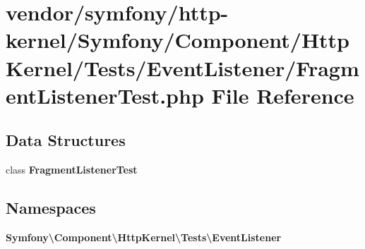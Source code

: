 \section{vendor/symfony/http-\/kernel/\+Symfony/\+Component/\+Http\+Kernel/\+Tests/\+Event\+Listener/\+Fragment\+Listener\+Test.php File Reference}
\label{_fragment_listener_test_8php}
\subsection*{Data Structures}
\begin{DoxyCompactItemize}
\item 
class {\bf Fragment\+Listener\+Test}
\end{DoxyCompactItemize}
\subsection*{Namespaces}
\begin{DoxyCompactItemize}
\item 
 {\bf Symfony\textbackslash{}\+Component\textbackslash{}\+Http\+Kernel\textbackslash{}\+Tests\textbackslash{}\+Event\+Listener}
\end{DoxyCompactItemize}
